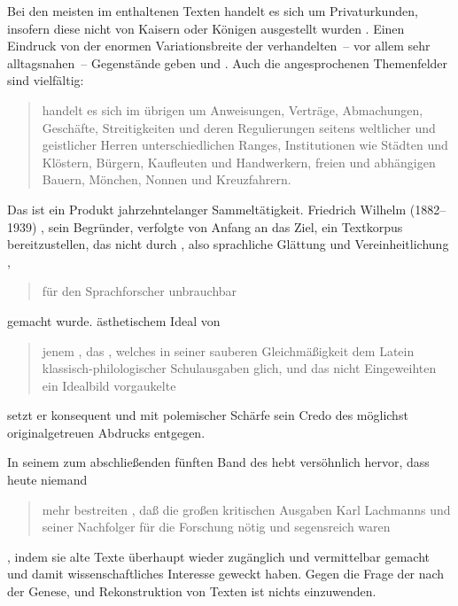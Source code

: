 %
Bei den meisten im \CAO{} enthaltenen Texten handelt es sich um
Privaturkunden, insofern diese nicht von Kaisern oder Königen
ausgestellt wurden \autocites[vgl.][575]{frenz1998a}[585]{frenz1998b}. Einen
Eindruck von der enormen Variationsbreite der verhandelten~-- vor allem sehr
alltagsnahen~-- Gegen\-stände geben \citet[11]{schulze2011} und
\citet[35--36]{ganslmayer2012}. Auch die angesprochenen Themenfelder sind
vielfältig: \blockcquote[596]{schmidtwiegand1998b}{ handelt es sich
im übrigen um Anweisungen, Verträge, Abmachungen, Geschäfte, Streitigkeiten und
deren Regulierungen seitens weltlicher und geistlicher Herren unterschiedlichen
Ranges, Institutionen wie Städten und Klöstern, Bürgern, Kaufleuten und
Handwerkern, freien und abhängigen Bauern, Mönchen, Nonnen und Kreuzfahrern.}

\begin{sloppypar}
Das \CAO{} ist ein Produkt jahrzehntelanger Sammeltätigkeit. Friedrich
Wilhelm\nocite{wilhelm1932} (1882--1939)%
, sein Begründer, verfolgte von Anfang an das Ziel, ein Textkorpus
bereitzustellen, das nicht durch , also
sprachliche Glättung und Vereinheitlichung
\autocites[vgl.][76--84]{bein2011}{kragl2015},
\blockcquote[\RN{60}]{wilhelm1932}{für den Sprachforscher unbrauchbar} gemacht
wurde.  ästhetischem Ideal von
\blockcquote[\RN{3}]{wilhelm1932}{jenem , das
 \textelp{}, welches in seiner
sauberen Gleichmäßigkeit dem Latein klassisch-philo\-logi\-scher Schulausgaben
glich, und das \textelp{} nicht Eingeweihten ein Idealbild vorgaukelte} setzt
er konsequent und mit polemischer Schärfe sein Credo des möglichst
originalgetreuen Abdrucks entgegen.
\end{sloppypar}

In seinem  zum abschließenden fünften Band des
\CAO{} hebt \citet[\RN{13}]{deboor1976} versöhnlich hervor, dass heute
niemand \blockquote{mehr bestreiten , daß
die großen kritischen Ausgaben Karl Lachmanns und seiner
Nachfolger für die Forschung nötig und segensreich waren}, indem sie alte Texte
überhaupt wieder zugänglich und vermittelbar gemacht und damit
wissenschaftliches Interesse geweckt haben. Gegen die Frage der
 nach der Genese,  und
Rekonstruktion von Texten ist nichts einzuwenden.

